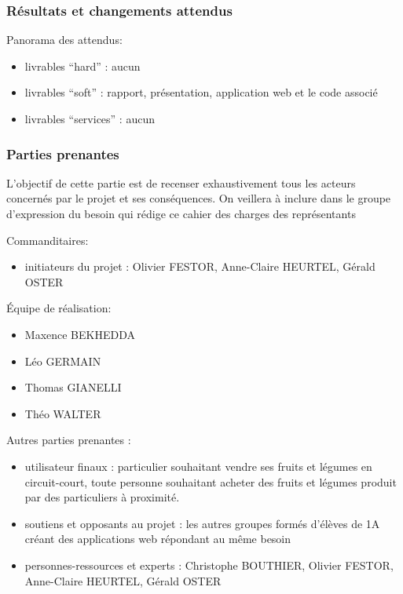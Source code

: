 \documentclass[11pt]{article}
\begin{document}
\subsubsection{Résultats et changements attendus}
	Panorama des attendus:
	\begin{itemize}
		\item 	livrables “hard” : aucun
		\item	livrables “soft” : rapport, présentation, application web et le code associé
		\item	livrables “services” : aucun
	\end{itemize}
	
\subsubsection{Parties prenantes}
L'objectif de cette partie est de recenser exhaustivement tous les acteurs concernés par le projet et ses conséquences. On veillera à inclure dans le groupe d’expression du besoin qui rédige ce cahier des charges des représentants 
\vspace{0.2cm}

\noindent Commanditaires: 
\begin{itemize}
	\item 
	initiateurs du projet : Olivier FESTOR, Anne-Claire HEURTEL, Gérald OSTER 
	\end{itemize}
	
\vspace{0.2cm}

\noindent Équipe de réalisation:
\begin{itemize}
	\item Maxence BEKHEDDA
	\item Léo GERMAIN
	\item Thomas GIANELLI
	\item Théo WALTER
\end{itemize}

\vspace{0.2cm}

\noindent Autres parties prenantes :
\begin{itemize}
	\item utilisateur finaux : particulier souhaitant vendre ses fruits et légumes en circuit-court, toute personne souhaitant acheter des fruits et légumes produit par des particuliers à proximité.
		\item	soutiens et opposants au projet : les autres groupes formés d’élèves de 1A créant des applications web répondant au même besoin
		\item	personnes-ressources et experts : Christophe BOUTHIER, Olivier FESTOR, Anne-Claire HEURTEL, Gérald OSTER 
\end{itemize}
\end{document}
